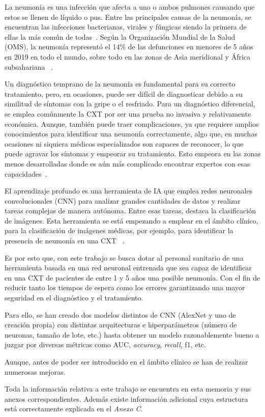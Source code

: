 
La neumonía es una infección que afecta a uno o ambos pulmones causando que estos se llenen de líquido o pus. Entre las principales causas de la neumonía, se encuentran las infecciones bacterianas, virales y fúngicas siendo la primera de ellas la más común de todas~\cite{med24}.
Según la Organización Mundial de la Salud (OMS), la neumonía representó el 14\% de las defunciones en menores de 5 años en 2019 en todo el mundo, sobre todo en las zonas de Asia meridional y África subsahariana ~\cite{oms24}.

Un diagnóstico temprano de la neumonía es fundamental para su correcto tratamiento, pero, en ocasiones, puede ser difícil de diagnosticar debido a su similitud de síntomas con la gripe o el resfriado. Para un diagnóstico diferencial, se emplea comúnmente la CXT por ser una prueba no invasiva y relativamente económica. Aunque, también puede traer complicaciones, ya que requiere amplios conocimientos para identificar una neumonía correctamente, algo que, en muchas ocasiones ni siquiera médicos especializados son capaces de reconocer, lo que puede agravar los síntomas y empeorar su tratamiento. Esto empeora en las zonas menos desarrolladas donde es aún más complicado encontrar expertos con esas capacidades~\cite{Irfan20, kundu2021pneumonia}.

El aprendizaje profundo es una herramienta de IA que emplea redes neuronales convolucionales (CNN) para analizar grandes cantidades de datos y realizar tareas complejas de manera autónoma. Entre esas tareas, destaca la clasificación de imágenes. Esta herramienta se está empezando a emplear en el ámbito clínico, para la clasificación de imágenes médicas, por ejemplo, para identificar la presencia de neumonía en una CXT ~\cite{kundu2021pneumonia}.

Es por esto que, con este trabajo se busca dotar al personal sanitario de una herramienta basada en una red neuronal entrenada que sea capaz de identificar en una CXT de pacientes de entre 1 y 5 años una posible neumonía. Con el fin de reducir tanto los tiempos de espera como los errores garantizando una mayor seguridad en el diagnóstico y el tratamiento. 

Para ello, se han creado dos modelos distintos de CNN (AlexNet y uno de creación propia) con distintas arquitecturas e hiperparámetros (número de neuronas, tamaño de lote, etc.) hasta obtener un modelo razonablemente bueno a juzgar por diversas métricas como AUC, \textit{accuracy}, \textit{recall}, f1, etc. 

Aunque, antes de poder ser introducido en el ámbito clínico se han de realizar numerosas mejoras.

Toda la información relativa a este trabajo se encuentra en esta memoria y sus anexos correspondientes. Además existe información adicional cuya estructura está correctamente explicada en el \textit{Anexo C}.

